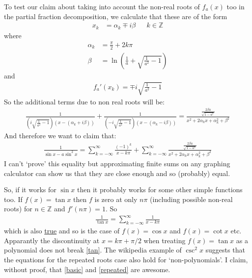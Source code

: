 \documentclass{article}
\begin{document}
To test our claim about taking into account the non-real roots of $f_a(x)$ too in the partial fraction decomposition, we calculate that these are of the form
\begin{align}
    x_k &= \alpha_k \mp i \beta && k \in \mathbb{Z} 
\end{align}
where
\begin{align}
    \alpha_k &= \frac{\pi}{2} + 2k\pi \\
    \beta &= \ln \left(\frac{1}{a} + \sqrt{\frac{1}{a^2} - 1}\right)
\end{align}
and
\begin{align}
    f_a'(x_k) = \mp i \sqrt{\frac{1}{a^2} - 1}
\end{align}
So the additional terms due to non real roots will be:
\begin{align}
    \frac{1}{\left(i\sqrt{\frac{1}{a^2}-1}\right) \left(x - (\alpha_k + i \beta)\right)} + \frac{1}{\left(-i\sqrt{\frac{1}{a^2}-1}\right) \left(x - (\alpha_k - i \beta)\right)} = \frac{\frac{2\beta a}{\sqrt{1-a^2}}}{x^2 + 2\alpha_k x + \alpha_k^2 + \beta^2}
\end{align}
And therefore we want to claim that:
\begin{align}
    \frac{1}{\sin x - a \sin^2 x} = \sum_{k = -\infty}^{\infty} \frac{(-1)^k}{x-k\pi} + \sum_{k = -\infty}^{\infty} \frac{\frac{2\beta a}{\sqrt{1-a^2}}}{x^2 + 2\alpha_k x + \alpha_k^2 + \beta^2}
\end{align}
I can't `prove' this equality but approximating finite sums on any graphing calculator can show us that they are close enough and so (probably) equal.

So, if it works for $\sin x$ then it probably works for some other simple functions too. If $f(x) = \tan x$ then $f$ is zero at only $n\pi$ (including possible non-real roots) for $n \in \mathbb{Z}$ and $f'(n\pi) = 1$. So
\begin{align}
    \frac{1}{\tan x} = \sum_{k = -\infty}^{\infty} \frac{1}{x-k\pi} \label{tan}
\end{align}
which is also \href{https://en.wikipedia.org/wiki/Trigonometric_functions#Partial_fraction_expansion}{true} and so is the case of $f(x) = \cos x$ and $f(x) = \cot x$ etc. Apparantly the discontinuity at $x = k\pi + \pi/2$ when treating $f(x) = \tan x$ as a polynomial does not break \eqref{tan}. The wikipedia example of $\csc^2 x$ suggests that the equations for the repeated roots case also hold for `non-polynomials'. I claim, without proof, that \eqref{basic} and \eqref{repeated} are awesome.
\end{document}
